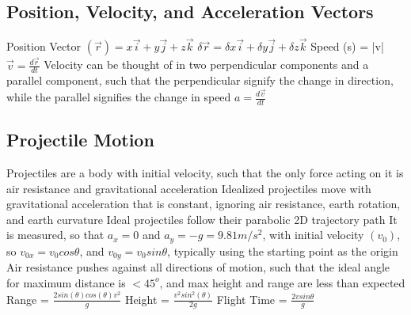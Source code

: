 \documentclass[11 pt, twoside]{article}
\newenvironment{outline*}
{
	\begin{outline}[enumerate]
	}
	{\end{outline}
}
\begin{document}
\subsection{Position, Velocity, and Acceleration Vectors}
\begin{outline*}
\1 Position Vector $(\vec{r}) = x\vec{i} + y\vec{j} + z\vec{k}$
\1 $\delta \vec{r} = \delta x\vec{i} + \delta y\vec{j} + \delta z\vec{k}$
\1 Speed (s) = |v|
\1 $\vec{v} = \frac{d\vec{r}}{dt}$
\1 Velocity can be thought of in two perpendicular components and a parallel component, such that the perpendicular signify the change in direction, while the parallel signifies the change in speed
\1 $a = \frac{d\vec{v}}{dt}$
\end{outline*}
\subsection{Projectile Motion}
\begin{outline*}
\1 Projectiles are a body with initial velocity, such that the only force acting on it is air resistance and gravitational acceleration
\1 Idealized projectiles move with gravitational acceleration that is constant, ignoring air resistance, earth rotation, and earth curvature
\2 Ideal projectiles follow their parabolic 2D trajectory path
\1 It is measured, so that $a_x = 0$ and $a_y = -g = 9.81 m/s^2$, with initial velocity $(v_0)$, so $v_{0x} = v_0cos\theta$, and $v_{0y} = v_0sin\theta$, typically using the starting point as the origin
\1 Air resistance pushes against all directions of motion, such that the ideal angle for maximum distance is $<45^o$, and max height and range are less than expected
\1 Range = $\frac{2sin(\theta)cos(\theta)v^2}{g}$
\1 Height = $\frac{v^2sin^2(\theta)}{2g}$
\1 Flight Time = $\frac{2vsin\theta}{g}$
\end{outline*}
\end{document}
